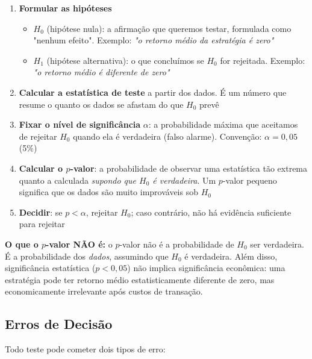 \documentclass[11pt,a4paper]{article}
\theoremstyle{quant}
\begin{document}
\begin{enumerate}
  \item \textbf{Formular as hipóteses}
    \begin{itemize}
      \item $H_0$ (hipótese nula): a afirmação que queremos testar, formulada como
            "nenhum efeito". Exemplo: \emph{"o retorno médio da estratégia é zero"}
      \item $H_1$ (hipótese alternativa): o que concluímos se $H_0$ for rejeitada.
            Exemplo: \emph{"o retorno médio é diferente de zero"}
    \end{itemize}

  \item \textbf{Calcular a estatística de teste} a partir dos dados. É um número
        que resume o quanto os dados se afastam do que $H_0$ prevê

  \item \textbf{Fixar o nível de significância} $\alpha$: a probabilidade máxima que
        aceitamos de rejeitar $H_0$ quando ela é verdadeira (falso alarme). Convenção:
        $\alpha = 0{,}05$ (5\%)

  \item \textbf{Calcular o $p$-valor}: a probabilidade de observar uma estatística
        tão extrema quanto a calculada \emph{supondo que $H_0$ é verdadeira}.
        Um $p$-valor pequeno significa que os dados são muito improváveis sob $H_0$

  \item \textbf{Decidir}: se $p < \alpha$, rejeitar $H_0$; caso contrário, não há
        evidência suficiente para rejeitar
\end{enumerate}

\begin{caixaatencao}
\textbf{O que o $p$-valor NÃO é:} o $p$-valor não é a probabilidade de $H_0$ ser
verdadeira. É a probabilidade dos \emph{dados}, assumindo que $H_0$ é verdadeira.
Além disso, significância estatística ($p < 0{,}05$) não implica significância
econômica: uma estratégia pode ter retorno médio estatisticamente diferente de zero,
mas economicamente irrelevante após custos de transação.
\end{caixaatencao}

\subsection{Erros de Decisão}

Todo teste pode cometer dois tipos de erro:
\end{document}

